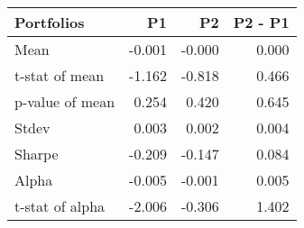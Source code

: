 \begin{tabular}{lrrr}
\toprule
Portfolios & P1 & P2 & P2 - P1 \\
\midrule
Mean & -0.001 & -0.000 & 0.000 \\
t-stat of mean & -1.162 & -0.818 & 0.466 \\
p-value of mean & 0.254 & 0.420 & 0.645 \\
Stdev & 0.003 & 0.002 & 0.004 \\
Sharpe & -0.209 & -0.147 & 0.084 \\
Alpha & -0.005 & -0.001 & 0.005 \\
t-stat of alpha & -2.006 & -0.306 & 1.402 \\
\bottomrule
\end{tabular}
